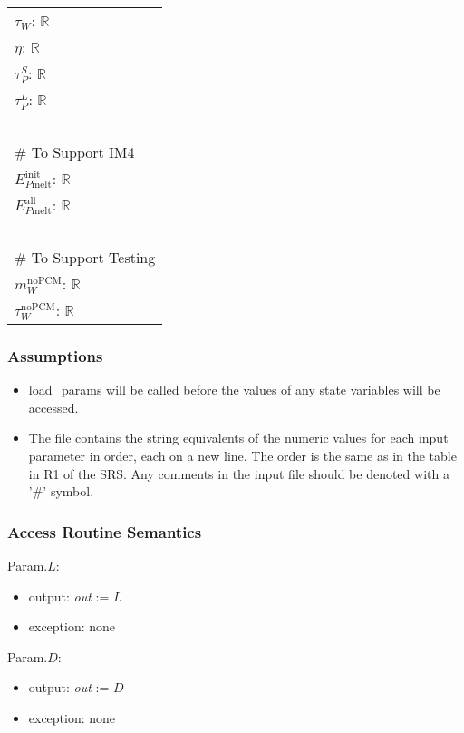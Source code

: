 \documentclass[12pt]{article}
\begin{document}
\begin{longtable*}[l]{l}
$\tau_W$: $\mathbb{R}$ \\
$\eta$: $\mathbb{R}$ \\
$\tau_P^S$: $\mathbb{R}$ \\
$\tau_P^L$: $\mathbb{R}$ \\
~\\
\# To Support IM4\\
$E_{P\text{melt}}^{\text{init}}$: $\mathbb{R}$ \\
$E_{P\text{melt}}^{\text{all}}$: $\mathbb{R}$ \\ 
~\\
\# To Support Testing\\
$m_W^{\text{noPCM}}$: $\mathbb{R}$ \\
$\tau_W^{\text{noPCM}}$: $\mathbb{R}$\\
\end{longtable*}

\subsubsection{Assumptions}

\begin{itemize}

\item load\_params will be called before the values of any state variables will be accessed.

\item The file contains the string equivalents of the numeric values for
each input parameter in order, each on a new line. The order is the same as in
the table in R1 of the SRS. Any comments in the input file should be denoted
with a '\#' symbol.

\end{itemize}

\subsubsection{Access Routine Semantics}

\noindent Param.$L$:
\begin{itemize}
\item output: \textit{out} := $L$
\item exception: none
\end{itemize}

\noindent Param.$D$:
\begin{itemize}
\item output: \textit{out} := $D$
\item exception: none
\end{itemize}
\end{document}
